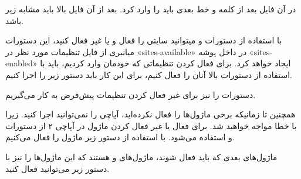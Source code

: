 در آن فایل بعد از کلمه 
و خط بعدی باید
 را وارد کرد.  بعد از آن فایل بالا باید مشابه زیر باشد.
\newline
\begin{latin}
    
    
\end{latin}
با استفاده از دستورات 
 و 
 میتوانید سایتی را فعال و یا غیر فعال کنید، این دستورات میانبری از فایل تنظیمات مورد نظر در «sites-available» در داخل پوشه «sites-enabled» ایجاد خواهد کرد. برای فعال کردن تنظیماتی که خودمان وارد کردیم، باید با استفاده از دستورات بالا آنان را فعال کنیم، برای این کار باید دستور زیر را اجرا کنیم.
\newline
\begin{latin}
    
    
\end{latin}
دستورات 
 را نیز برای غیر فعال کردن تنظیمات پیش‌فرض به کار می‌گیریم.
\begin{latin}
    
    
\end{latin}
همچنین تا زمانیکه برخی ماژول‌ها را فعال نکرده‌اید، آپاچی را نمی‌توانید اجرا کنید. زیرا با خطا مواجه خواهید شد. برای فعال یا غیر فعال کردن ماژول در آپاچی ۲ از دستورات 
 و 
  استفاده می‌شود. با استفاده از دستور زیر ماژول 
   را فعال می‌کنیم.
\begin{latin}
    
    
\end{latin}
ماژول‌های بعدی که باید فعال شوند، ماژول‌های 
 و 
  هستند که این ماژول‌ها را نیز با دستور زیر می‌توانید فعال کنید.
\begin{latin}
    
    
\end{latin}

